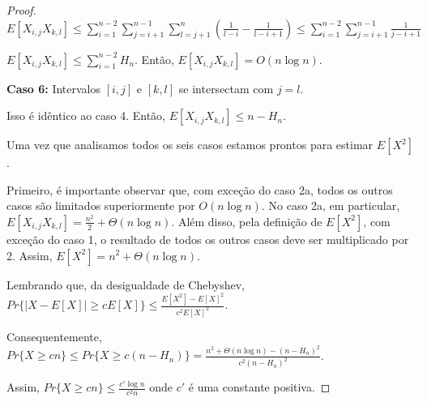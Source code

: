 \documentclass[dissertacao, brazil]{ThesisPUC}
\begin{document}
\begin{proof}
$E[X_{i,j} X_{k,l}] \leq \sum\limits_{i=1}^{n-2}
\sum\limits_{j=i+1}^{n-1} \sum\limits_{l=j+1}^{n} \left( \frac{1}{l-i} - \frac{1}{l-i+1} \right)
\leq \sum\limits_{i=1}^{n-2}
\sum\limits_{j=i+1}^{n-1} \frac{1}{j-i+1}
$

$E[X_{i,j} X_{k,l}] \leq \sum\limits_{i=1}^{n-2} H_{n}$. Então, $E[X_{i,j} X_{k,l}] = O(n \log n)$.


{\bf Caso 6:} Intervalos $[i, j]$ e $[k, l]$ se intersectam com $j = l$.

Isso é idêntico ao caso 4. Então, $E[X_{i,j} X_{k,l}] \leq n - H_{n}$.


\vspace{0.5cm}

Uma vez que analisamos todos os seis casos estamos prontos para estimar
$E[X^2]$.

Primeiro, é importante observar que, com exceção do caso 2a, todos os outros
casos são limitados superiormente por $O(n \log n)$. No caso 2a, em particular,
$E[X_{i,j} X_{k,l}] = \frac{n^2}{2} + \Theta(n \log n)$. Além disso, pela definição de $E[X^2]$,
com exceção do caso 1, o resultado de todos os outros casos deve ser multiplicado por 2.
Assim, $E[X^2] = n^2+ \Theta(n \log n)$.

Lembrando que, da desigualdade de Chebyshev, $Pr\{ |X - E[X]| \geq c E[X] \} \leq \frac{E[X^2] - E[X]^2}{c^2 E[X]^2}$.

Consequentemente, $Pr\{ X \geq c n \} \leq Pr\{ X \geq c (n - H_{n}) \} = \frac{n^2 + \Theta(n \log n) - (n - H_{n})^2}{c^2 (n - H_{n})^2}$.

Assim, $Pr\{ X \geq c n \} \leq \frac{c' \log n}{c^2 n}$ onde $c'$ é uma constante positiva.


\end{proof}









%
\end{document}

